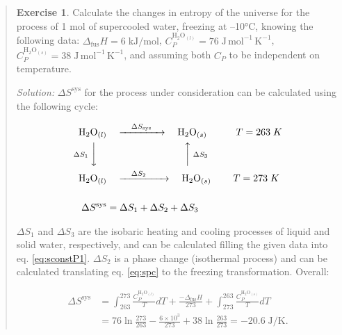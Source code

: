 \documentclass[
  9pt,
]{extbook}
\theoremstyle{definition}
\theoremstyle{definition}
\theoremstyle{definition}
\newtheorem{exercise}{Exercise}[chapter]
\theoremstyle{definition}
\theoremstyle{remark}
\begin{document}
\begin{quote}
\begin{exercise}
\protect\hypertarget{exr:supercooledEx}{}\label{exr:supercooledEx}Calculate the changes in entropy of the universe for the process of 1 mol of supercooled water, freezing at --10°C, knowing the following data: \(\Delta_{\mathrm{fus}}H = 6 \; \text{kJ/mol}\), \(C_P^{\mathrm{H}_2 \mathrm{O}_{(l)}}=76 \; \text{J} \, \text{mol}^{-1} \, \text{K}^{-1}\), \(C_P^{\mathrm{H}_2 \mathrm{O}_{(s)}}=38 \; \text{J} \, \text{mol}^{-1} \, \text{K}^{-1}\), and assuming both \(C_P\) to be independent on temperature.

\emph{Solution:} \(\Delta S^{\mathrm{sys}}\) for the process under consideration can be calculated using the following cycle:

\begin{equation}
\begin{aligned}
\mathrm{H}_2 \mathrm{O}_{(l)} & \quad \xrightarrow{\quad \Delta S_{\text{sys}} \quad} \quad \mathrm{H}_2 \mathrm{O}_{(s)} \qquad \quad T=263\;K\\
\scriptstyle{\Delta S_1} \; \bigg\downarrow \quad & \qquad \qquad \qquad \qquad \scriptstyle{\bigg\uparrow  \; \Delta S_3} \\
\mathrm{H}_2 \mathrm{O}_{(l)} & \quad \xrightarrow{\quad \Delta S_2 \qquad} \quad \mathrm{H}_2\mathrm{O}_{(s)} \qquad \; T=273\;K\\
\\
\Delta S^{\text{sys}} & = \Delta S_1 + \Delta S_2 + \Delta S_3
\end{aligned}
\label{eq:supercooledsyst}
\end{equation}

\(\Delta S_1\) and \(\Delta S_3\) are the isobaric heating and cooling processes of liquid and solid water, respectively, and can be calculated filling the given data into eq. \eqref{eq:sconstP1}. \(\Delta S_2\) is a phase change (isothermal process) and can be calculated translating eq. \eqref{eq:spc} to the freezing transformation. Overall:

\begin{equation}
\begin{aligned}
\Delta S^{\text{sys}} & = \int_{263}^{273} \frac{C_P^{\mathrm{H}_2 \mathrm{O}_{(l)}}}{T}dT+\frac{-\Delta_{\mathrm{fus}}H}{273}+\int_{273}^{263} \frac{C_P^{\mathrm{H}_2 \mathrm{O}_{(s)}}}{T}dT \\
& = 76 \ln \frac{273}{263} - \frac{6 \times 10^3}{273} + 38 \ln \frac{263}{273}= -20.6 \; \text{J/K}.
\end{aligned}
\label{eq:supercooledsyst2}
\end{equation}


\end{exercise}
\end{quote}
\end{document}
